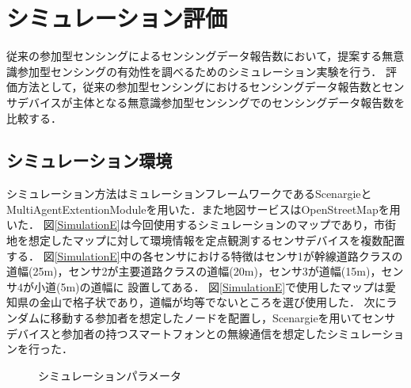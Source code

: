 \documentclass[submit,techrep]{ipsj}
\begin{document}
\section{シミュレーション評価}

従来の参加型センシングによるセンシングデータ報告数において，提案する無意識参加型センシングの有効性を調べるためのシミュレーション実験を行う．
評価方法として，従来の参加型センシングにおけるセンシングデータ報告数とセンサデバイスが主体となる無意識参加型センシングでのセンシングデータ報告数を比較する．

\subsection{シミュレーション環境}
シミュレーション方法はミュレーションフレームワークであるScenargieとMultiAgentExtentionModuleを用いた．また地図サービスはOpenStreetMapを用いた．
図\ref{SimulationE}は今回使用するシミュレーションのマップであり，市街地を想定したマップに対して環境情報を定点観測するセンサデバイスを複数配置する．
図\ref{SimulationE}中の各センサにおける特徴はセンサ1が幹線道路クラスの道幅(25m)，センサ2が主要道路クラスの道幅(20m)，センサ3が道幅(15m)，センサ4が小道(5m)の道幅に
設置してある．
図\ref{SimulationE}で使用したマップは愛知県の金山で格子状であり，道幅が均等でないところを選び使用した．
次にランダムに移動する参加者を想定したノードを配置し，Scenargieを用いてセンサデバイスと参加者の持つスマートフォンとの無線通信を想定したシミュレーションを行った．

\begin{figure}[tb]
\begin{minipage}[t]{1.0\columnwidth}
\caption{シミュレーションパラメータ}
\label{tab:right}
\vskip1mm
\end{minipage}
\end{figure}
\end{document}
